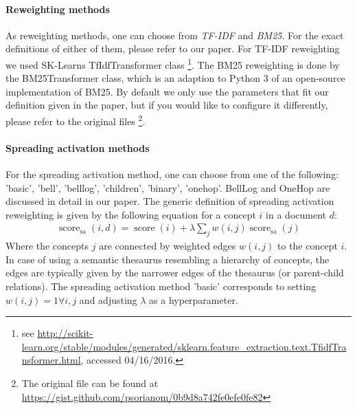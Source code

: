 \documentclass{article}
\begin{document}
\paragraph{Reweighting methods}
As reweighting methods, one can choose from \emph{TF-IDF} and \emph{BM25}. For the exact definitions of either of them, please
refer to our paper. For TF-IDF reweighting we used SK-Learns TfIdfTransformer class \footnote{
  see \url{http://scikit-learn.org/stable/modules/generated/sklearn.feature_extraction.text.TfidfTransformer.html}, accessed 04/16/2016.
}.
The BM25 reweighting is done by the BM25Transformer class, which is an adaption to Python 3 of an open-source
implementation of BM25. By default we only use the parameters that fit our definition given in the paper, but
if you would like to configure it differently, please refer to the original files
\footnote{The original file can be found at \url{https://gist.github.com/psorianom/0b9d8a742fe0efe0fe82}}.
\paragraph{Spreading activation methods}
For the spreading activation method, one can choose from one of the following:
'basic', 'bell', 'belllog', 'children', 'binary', 'onehop'.
BellLog and OneHop are discussed in detail in our paper.
The generic definition of spreading activation reweighting is given by the following equation for a concept $i$ in a document $d$:
\begin{align}
	\operatorname{score}_\text{sa}(i,d) = \operatorname{score}(i) + \lambda \sum_j w(i,j) \operatorname{score}_\text{sa}(j)
	\label{eq:sa}
\end{align}
Where the concepts $j$ are connected by weighted edges $w(i,j)$ to the concept $i$.
In case of using a semantic thesaurus resembling a hierarchy of concepts, the edges are typically given by the
narrower edges of the thesaurus (or parent-child relations).
The spreading activation method 'basic' corresponds to setting $w(i,j) = 1 \forall i,j$
and adjusting $\lambda$ as a hyperparameter.
\end{document}
